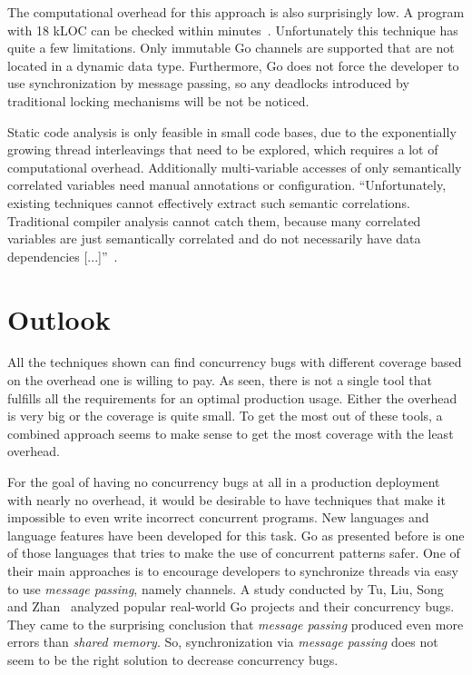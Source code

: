 \documentclass[conference]{IEEEtran}
\begin{document}
The computational overhead for this approach is also surprisingly low.
A program with 18 kLOC can be checked within minutes~\cite{lange2018verification}.
Unfortunately this technique has quite a few limitations.
Only immutable Go channels are supported that are not located in a dynamic data type.
Furthermore, Go does not force the developer to use synchronization by message passing, so any deadlocks introduced by traditional locking mechanisms will be not be noticed.

Static code analysis is only feasible in small code bases, due to the exponentially growing thread interleavings that need to be explored, which requires a lot of computational overhead.
Additionally multi-variable accesses of only semantically correlated variables need manual annotations or configuration.
``Unfortunately, existing techniques cannot effectively extract such semantic correlations. Traditional compiler analysis cannot catch them, because many correlated variables are just semantically correlated and do not necessarily have data dependencies [...]''~\cite{lu2007muvi}.


\section{Outlook}
\label{sct:outlook}

All the techniques shown can find concurrency bugs with different coverage based on the overhead one is willing to pay.
As seen, there is not a single tool that fulfills all the requirements for an optimal production usage.
Either the overhead is very big or the coverage is quite small.
To get the most out of these tools, a combined approach seems to make sense to get the most coverage with the least overhead.

For the goal of having no concurrency bugs at all in a production deployment with nearly no overhead, it would be desirable to have techniques that make it impossible to even write incorrect concurrent programs.
New languages and language features have been developed for this task.
Go as presented before is one of those languages that tries to make the use of concurrent patterns safer.
One of their main approaches is to encourage developers to synchronize threads via easy to use \emph{message passing}, namely channels.
A study conducted by Tu, Liu, Song and Zhan~\cite{tu2019go} analyzed popular real-world Go projects and their concurrency bugs.
They came to the surprising conclusion that \emph{message passing} produced even more errors than \emph{shared memory}.
So, synchronization via \emph{message passing} does not seem to be the right solution to decrease concurrency bugs.
\end{document}
